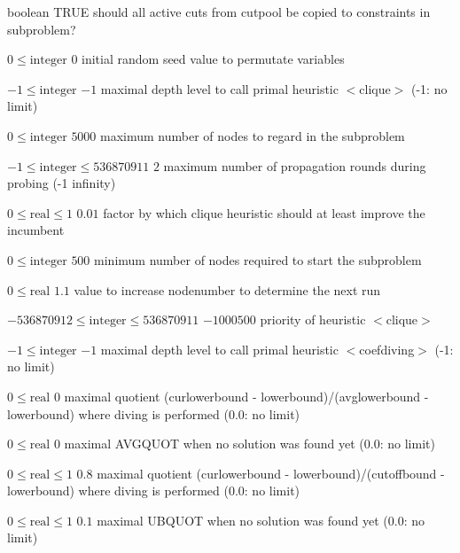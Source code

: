 %
{boolean}%
{TRUE}%
{should all active cuts from cutpool be copied to constraints in subproblem?}%
{}

%
{$0\leq\textrm{integer}$}%
{$0$}%
{initial random seed value to permutate variables}%
{}

%
{$-1\leq\textrm{integer}$}%
{$-1$}%
{maximal depth level to call primal heuristic $<$clique$>$ (-1: no limit)}%
{}

%
{$0\leq\textrm{integer}$}%
{$5000$}%
{maximum number of nodes to regard in the subproblem}%
{}

%
{$-1\leq\textrm{integer}\leq536870911$}%
{$2$}%
{maximum number of propagation rounds during probing (-1 infinity)}%
{}

%
{$0\leq\textrm{real}\leq1$}%
{$0.01$}%
{factor by which clique heuristic should at least improve the incumbent}%
{}

%
{$0\leq\textrm{integer}$}%
{$500$}%
{minimum number of nodes required to start the subproblem}%
{}

%
{$0\leq\textrm{real}$}%
{$1.1$}%
{value to increase nodenumber to determine the next run}%
{}

%
{$-536870912\leq\textrm{integer}\leq536870911$}%
{$-1000500$}%
{priority of heuristic $<$clique$>$}%
{}

%
{$-1\leq\textrm{integer}$}%
{$-1$}%
{maximal depth level to call primal heuristic $<$coefdiving$>$ (-1: no limit)}%
{}

%
{$0\leq\textrm{real}$}%
{$0$}%
{maximal quotient (curlowerbound - lowerbound)/(avglowerbound - lowerbound) where diving is performed (0.0: no limit)}%
{}

%
{$0\leq\textrm{real}$}%
{$0$}%
{maximal AVGQUOT when no solution was found yet (0.0: no limit)}%
{}

%
{$0\leq\textrm{real}\leq1$}%
{$0.8$}%
{maximal quotient (curlowerbound - lowerbound)/(cutoffbound - lowerbound) where diving is performed (0.0: no limit)}%
{}

%
{$0\leq\textrm{real}\leq1$}%
{$0.1$}%
{maximal UBQUOT when no solution was found yet (0.0: no limit)}%
{}

